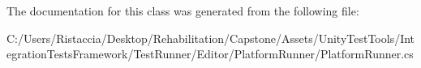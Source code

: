The documentation for this class was generated from the following file\+:\begin{DoxyCompactItemize}
\item 
C\+:/\+Users/\+Ristaccia/\+Desktop/\+Rehabilitation/\+Capstone/\+Assets/\+Unity\+Test\+Tools/\+Integration\+Tests\+Framework/\+Test\+Runner/\+Editor/\+Platform\+Runner/Platform\+Runner.\+cs\end{DoxyCompactItemize}

